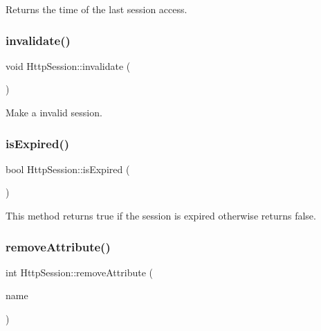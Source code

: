 Returns the time of the last session access. 

\mbox{\label{class_http_session_a1656b24f54bcd539f01022323a3c3b3c}} 
\subsubsection{\texorpdfstring{invalidate()}{invalidate()}}
{\footnotesize\ttfamily void Http\+Session\+::invalidate (\begin{DoxyParamCaption}{ }\end{DoxyParamCaption})}



Make a invalid session. 

\mbox{\label{class_http_session_a32e93aea1e8bbadcdf0d755110a95335}} 
\subsubsection{\texorpdfstring{is\+Expired()}{isExpired()}}
{\footnotesize\ttfamily bool Http\+Session\+::is\+Expired (\begin{DoxyParamCaption}{ }\end{DoxyParamCaption})}



This method returns true if the session is expired otherwise returns false. 

\mbox{\label{class_http_session_a9102eedc7002a96cd64c080af9c4ac47}} 
\subsubsection{\texorpdfstring{remove\+Attribute()}{removeAttribute()}}
{\footnotesize\ttfamily int Http\+Session\+::remove\+Attribute (\begin{DoxyParamCaption}\item[{const Q\+String \&}]{name }\end{DoxyParamCaption})}



